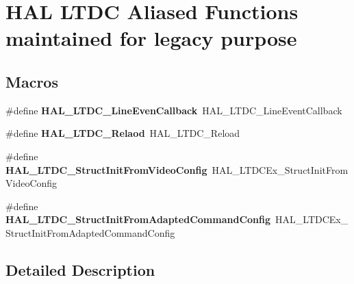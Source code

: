 \hypertarget{group___h_a_l___l_t_d_c___aliased___functions}{}\section{H\+AL L\+T\+DC Aliased Functions maintained for legacy purpose}
\label{group___h_a_l___l_t_d_c___aliased___functions}
\subsection*{Macros}
\begin{DoxyCompactItemize}
\item 
\mbox{\label{group___h_a_l___l_t_d_c___aliased___functions_ga9db84d8e2888690969d2cb8db7b96d0e}} 
\#define {\bfseries H\+A\+L\+\_\+\+L\+T\+D\+C\+\_\+\+Line\+Even\+Callback}~H\+A\+L\+\_\+\+L\+T\+D\+C\+\_\+\+Line\+Event\+Callback
\item 
\mbox{\label{group___h_a_l___l_t_d_c___aliased___functions_gad1e34250a1cd7818eb43a6ba601508c2}} 
\#define {\bfseries H\+A\+L\+\_\+\+L\+T\+D\+C\+\_\+\+Relaod}~H\+A\+L\+\_\+\+L\+T\+D\+C\+\_\+\+Reload
\item 
\mbox{\label{group___h_a_l___l_t_d_c___aliased___functions_gaab10aa276becaede12de0aa022179a19}} 
\#define {\bfseries H\+A\+L\+\_\+\+L\+T\+D\+C\+\_\+\+Struct\+Init\+From\+Video\+Config}~H\+A\+L\+\_\+\+L\+T\+D\+C\+Ex\+\_\+\+Struct\+Init\+From\+Video\+Config
\item 
\mbox{\label{group___h_a_l___l_t_d_c___aliased___functions_gaae7d5975926b94dfa67bff3a3f7cae1c}} 
\#define {\bfseries H\+A\+L\+\_\+\+L\+T\+D\+C\+\_\+\+Struct\+Init\+From\+Adapted\+Command\+Config}~H\+A\+L\+\_\+\+L\+T\+D\+C\+Ex\+\_\+\+Struct\+Init\+From\+Adapted\+Command\+Config
\end{DoxyCompactItemize}


\subsection{Detailed Description}
